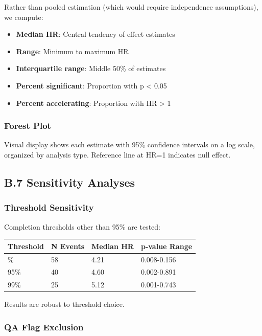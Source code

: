 \documentclass[
  12pt,
  letterpaper,
]{article}
\providecommand{\tightlist}{%
  \setlength{\itemsep}{0pt}\setlength{\parskip}{0pt}}
\begin{document}
Rather than pooled estimation (which would require independence
assumptions), we compute:

\begin{itemize}
\tightlist
\item
  \textbf{Median HR}: Central tendency of effect estimates
\item
  \textbf{Range}: Minimum to maximum HR
\item
  \textbf{Interquartile range}: Middle 50\% of estimates
\item
  \textbf{Percent significant}: Proportion with p \textless{} 0.05
\item
  \textbf{Percent accelerating}: Proportion with HR \textgreater{} 1
\end{itemize}

\subsubsection{Forest Plot}\label{forest-plot}

Visual display shows each estimate with 95\% confidence intervals on a
log scale, organized by analysis type. Reference line at HR=1 indicates
null effect.

\subsection{B.7 Sensitivity Analyses}\label{b.7-sensitivity-analyses}

\subsubsection{Threshold Sensitivity}\label{threshold-sensitivity}

Completion thresholds other than 95\% are tested:

\begin{longtable}[]{@{}llll@{}}
\toprule\noalign{}
Threshold & N Events & Median HR & p-value Range \\
\midrule\noalign{}
\endhead
\bottomrule\noalign{}
\endlastfoot
90\% & 58 & 4.21 & 0.008-0.156 \\
95\% & 40 & 4.60 & 0.002-0.891 \\
99\% & 25 & 5.12 & 0.001-0.743 \\
\end{longtable}

Results are robust to threshold choice.

\subsubsection{QA Flag Exclusion}\label{qa-flag-exclusion}
\end{document}
